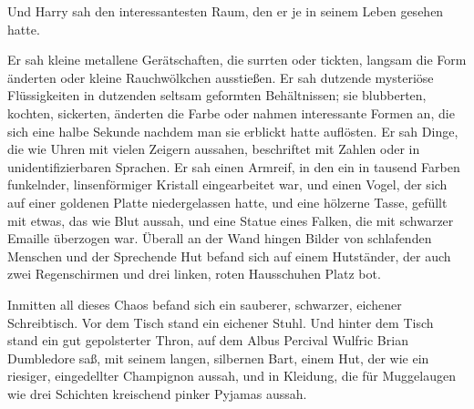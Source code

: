 Und Harry sah den interessantesten Raum, den er je in seinem Leben gesehen hatte.

Er sah kleine metallene Gerätschaften, die surrten oder tickten, langsam die Form änderten oder kleine Rauchwölkchen ausstießen. Er sah dutzende mysteriöse Flüssigkeiten in dutzenden seltsam geformten Behältnissen; sie blubberten, kochten, sickerten, änderten die Farbe oder nahmen interessante Formen an, die sich eine halbe Sekunde nachdem man sie erblickt hatte auflösten. Er sah Dinge, die wie Uhren mit vielen Zeigern aussahen, beschriftet mit Zahlen oder in unidentifizierbaren Sprachen. Er sah einen Armreif, in den ein in tausend Farben funkelnder, linsenförmiger Kristall eingearbeitet war, und einen Vogel, der sich auf einer goldenen Platte niedergelassen hatte, und eine hölzerne Tasse, gefüllt mit etwas, das wie Blut aussah, und eine Statue eines Falken, die mit schwarzer Emaille überzogen war. Überall an der Wand hingen Bilder von schlafenden Menschen und der Sprechende Hut befand sich auf einem Hutständer, der auch zwei Regenschirmen und drei linken, roten Hausschuhen Platz bot.

Inmitten all dieses Chaos befand sich ein sauberer, schwarzer, eichener Schreibtisch. Vor dem Tisch stand ein eichener Stuhl. Und hinter dem Tisch stand ein gut gepolsterter Thron, auf dem Albus Percival Wulfric Brian Dumbledore saß, mit seinem langen, silbernen Bart, einem Hut, der wie ein riesiger, eingedellter Champignon aussah, und in Kleidung, die für Muggelaugen wie drei Schichten kreischend pinker Pyjamas aussah.

